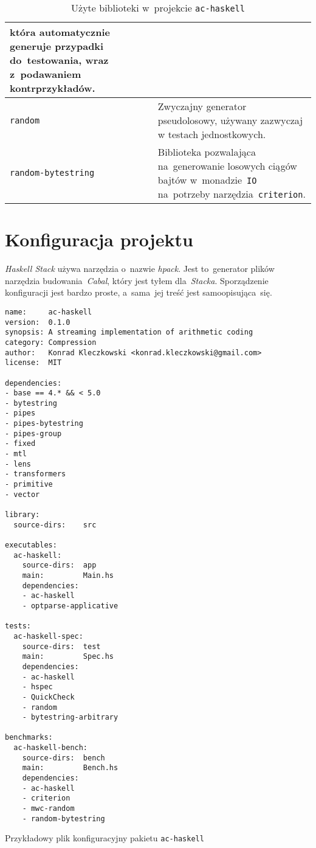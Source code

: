 \documentclass[../../praca.tex]{subfiles}
\begin{document}
\begin{table}
\begin{tabular}{|l|p{8cm}|}
                                  która automatycznie generuje przypadki do~testowania, wraz z~podawaniem kontrprzykładów. \\ \hline
    \texttt{random}             & Zwyczajny generator pseudolosowy, używany 
                                  zazwyczaj w testach jednostkowych. \\ \hline
    \texttt{random-bytestring}  & Biblioteka pozwalająca na~generowanie losowych ciągów bajtów
                                  w~monadzie~\texttt{IO} na~potrzeby narzędzia~\texttt{criterion}. \\ \hline
  \end{tabular}
  \caption{Użyte biblioteki w~projekcie \texttt{ac-haskell}}
  \label{tab:libs}
\end{table}

\section{Konfiguracja projektu}

\emph{Haskell Stack} używa narzędzia o~nazwie \emph{hpack}. 
Jest to~generator plików narzędzia budowania~\emph{Cabal},
który jest tyłem dla~\emph{Stacka}. Sporządzenie konfiguracji
jest bardzo proste, a~sama~jej treść jest samoopisująca~się.


\begin{listing}
  \begin{verbatim}
name:     ac-haskell
version:  0.1.0
synopsis: A streaming implementation of arithmetic coding
category: Compression
author:   Konrad Kleczkowski <konrad.kleczkowski@gmail.com>
license:  MIT

dependencies:
- base == 4.* && < 5.0
- bytestring
- pipes
- pipes-bytestring
- pipes-group
- fixed
- mtl
- lens
- transformers
- primitive
- vector

library:
  source-dirs:    src

executables:
  ac-haskell:
    source-dirs:  app
    main:         Main.hs
    dependencies:
    - ac-haskell
    - optparse-applicative

tests:
  ac-haskell-spec:
    source-dirs:  test
    main:         Spec.hs
    dependencies:
    - ac-haskell
    - hspec
    - QuickCheck
    - random
    - bytestring-arbitrary

benchmarks:
  ac-haskell-bench:
    source-dirs:  bench
    main:         Bench.hs
    dependencies:
    - ac-haskell
    - criterion
    - mwc-random
    - random-bytestring
  \end{verbatim}
  \caption{Przykładowy plik konfiguracyjny pakietu \texttt{ac-haskell}}
\end{listing}
\end{document}
